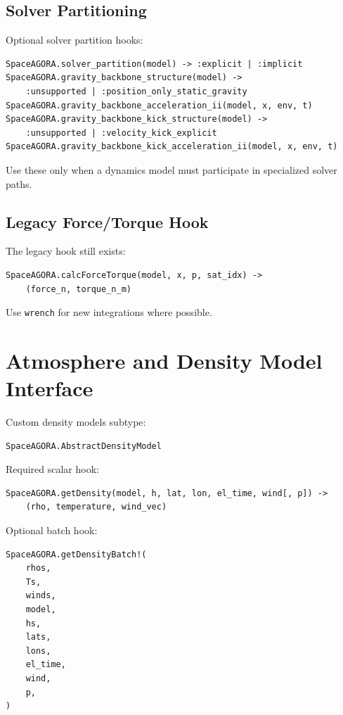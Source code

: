 \documentclass[11pt]{article}
\begin{document}
\subsection{Solver Partitioning}

Optional solver partition hooks:

\begin{lstlisting}
SpaceAGORA.solver_partition(model) -> :explicit | :implicit
SpaceAGORA.gravity_backbone_structure(model) ->
    :unsupported | :position_only_static_gravity
SpaceAGORA.gravity_backbone_acceleration_ii(model, x, env, t)
SpaceAGORA.gravity_backbone_kick_structure(model) ->
    :unsupported | :velocity_kick_explicit
SpaceAGORA.gravity_backbone_kick_acceleration_ii(model, x, env, t)
\end{lstlisting}

Use these only when a dynamics model must participate in specialized solver
paths.

\subsection{Legacy Force/Torque Hook}

The legacy hook still exists:

\begin{lstlisting}
SpaceAGORA.calcForceTorque(model, x, p, sat_idx) ->
    (force_n, torque_n_m)
\end{lstlisting}

Use \texttt{wrench} for new integrations where possible.

\section{Atmosphere and Density Model Interface}

Custom density models subtype:

\begin{lstlisting}
SpaceAGORA.AbstractDensityModel
\end{lstlisting}

Required scalar hook:

\begin{lstlisting}
SpaceAGORA.getDensity(model, h, lat, lon, el_time, wind[, p]) ->
    (rho, temperature, wind_vec)
\end{lstlisting}

Optional batch hook:

\begin{lstlisting}
SpaceAGORA.getDensityBatch!(
    rhos,
    Ts,
    winds,
    model,
    hs,
    lats,
    lons,
    el_time,
    wind,
    p,
)
\end{lstlisting}
\end{document}
